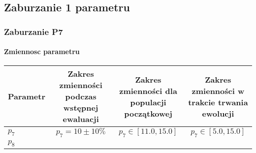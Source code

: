 \documentclass[]{article}
\let\oldparagraph\paragraph
\renewcommand{\paragraph}[1]{\oldparagraph{#1}\mbox{}}
\begin{document}
\subsection{Zaburzanie 1 parametru}\label{zaburzanie-1-parametru}

\subsubsection{Zaburzanie P7}\label{zaburzanie-p7}

\paragraph{Zmiennosc parametru}\label{zmiennosc-parametru}

\begin{longtable}[c]{@{}lccc@{}}
\toprule
\begin{minipage}[b]{0.13\columnwidth}\raggedright\strut
Parametr
\strut\end{minipage} &
\begin{minipage}[b]{0.26\columnwidth}\centering\strut
Zakres zmienności podczas wstępnej ewaluacji
\strut\end{minipage} &
\begin{minipage}[b]{0.24\columnwidth}\centering\strut
Zakres zmienności dla populacji początkowej
\strut\end{minipage} &
\begin{minipage}[b]{0.26\columnwidth}\centering\strut
Zakres zmienności w trakcie trwania ewolucji
\strut\end{minipage}\tabularnewline
\midrule
\endhead
\begin{minipage}[t]{0.13\columnwidth}\raggedright\strut
\(p_7\)
\strut\end{minipage} &
\begin{minipage}[t]{0.26\columnwidth}\centering\strut
\(p_7 = 10 \pm 10\%\)
\strut\end{minipage} &
\begin{minipage}[t]{0.24\columnwidth}\centering\strut
\(p_7 \in [11.0,15.0]\)
\strut\end{minipage} &
\begin{minipage}[t]{0.26\columnwidth}\centering\strut
\(p_7 \in [5.0,15.0]\)
\strut\end{minipage}\tabularnewline
\begin{minipage}[t]{0.13\columnwidth}\raggedright\strut
\(p_8\)
\strut\end{minipage} &
\begin{minipage}[t]{0.26\columnwidth}\centering\strut

\end{minipage}
\end{longtable}
\end{document}
